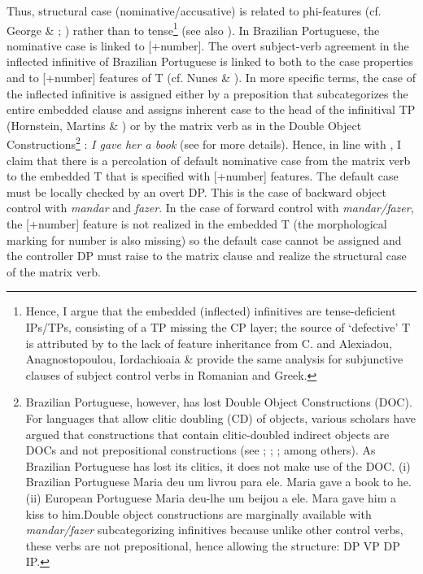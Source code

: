 \documentclass[output=paper]{langsci/langscibook}
\begin{document}
Thus, structural case (nominative/accusative) is related to phi-features (cf. George \& \citealt{Kornfilt1981}; \citealt{Sitaridou2006}) rather than to tense\footnote{Hence, I argue that the embedded (inflected) infinitives are tense-deficient IPs/TPs, consisting of a TP missing the CP layer; the source of ‘defective’ T is attributed by \citet{Chomsky2008} to the lack of feature inheritance from C. \citet{Alboiu2007} and Alexiadou, Anagnostopoulou, Iordachioaia \& \citet{Marchis2010} provide the same analysis for subjunctive clauses of subject control verbs in Romanian and Greek.} (see also \citealt{Pires2010}). In Brazilian Portuguese, the nominative case is linked to [+number]. The overt subject-verb agreement in the inflected infinitive of Brazilian Portuguese is linked to both to the case properties and to [+number] features of T (cf. Nunes \& \citealt{Raposo1998}). In more specific terms, the case of the inflected infinitive is assigned either by a preposition that subcategorizes the entire embedded clause and assigns inherent case to the head of the infinitival TP (Hornstein, Martins \& \citealt{Nunes2008}) or by the matrix verb as in the Double Object Constructions\footnote{Brazilian Portuguese, however, has lost Double Object Constructions (DOC). For languages that allow clitic doubling (CD) of objects, various scholars have argued that constructions that contain clitic-doubled indirect objects are DOCs and not prepositional constructions (see \citealt{Demonte1995}; \citealt{Bleam1999}; \citealt{Anagnostopoulou2003}; among others). As Brazilian Portuguese has lost its clitics, it does not make use of the DOC. (i)  Brazilian Portuguese Maria deu   um livrou para ele.            Maria gave a     book  to      he.(ii)  European Portuguese  Maria deu-lhe   um beijou a  ele.            Mara  gave him a    kiss    to him.Double object constructions are marginally available with \textit{mandar/fazer} subcategorizing infinitives because unlike other control verbs, these verbs are not prepositional, hence allowing the structure: DP VP DP IP.} : \textit{I gave her a book} (see \citealt{Larson1991} for more details). Hence, in line with \citet{Raposo1987}, I claim that there is a percolation of default nominative case from the matrix verb to the embedded T that is specified with [+number] features. The default case must be locally checked by an overt DP. This is the case of backward object control with \textit{mandar} and \textit{fazer}. In the case of forward control with \textit{mandar/fazer}, the [+number] feature is not realized in the embedded T (the morphological marking for number is also missing) so the default case cannot be assigned and the controller DP must raise to the matrix clause and realize the structural case of the matrix verb.
\end{document}
